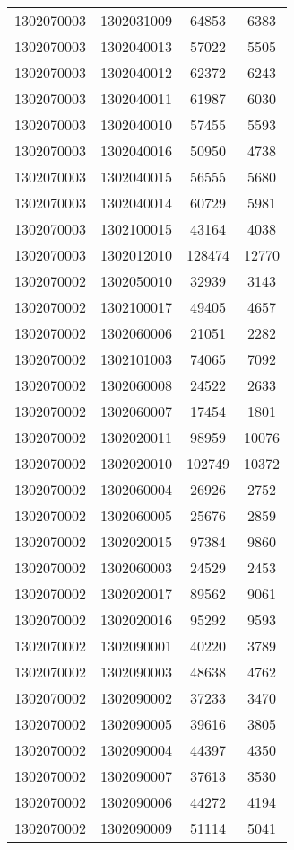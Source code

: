 \begin{longtable}[h]{llcc}
		1302070003 & 1302031009 & 64853 & 6383\\
		1302070003 & 1302040013 & 57022 & 5505\\
		1302070003 & 1302040012 & 62372 & 6243\\
		1302070003 & 1302040011 & 61987 & 6030\\
		1302070003 & 1302040010 & 57455 & 5593\\
		1302070003 & 1302040016 & 50950 & 4738\\
		1302070003 & 1302040015 & 56555 & 5680\\
		1302070003 & 1302040014 & 60729 & 5981\\
		1302070003 & 1302100015 & 43164 & 4038\\
		1302070003 & 1302012010 & 128474 & 12770\\
		1302070002 & 1302050010 & 32939 & 3143\\
		1302070002 & 1302100017 & 49405 & 4657\\
		1302070002 & 1302060006 & 21051 & 2282\\
		1302070002 & 1302101003 & 74065 & 7092\\
		1302070002 & 1302060008 & 24522 & 2633\\
		1302070002 & 1302060007 & 17454 & 1801\\
		1302070002 & 1302020011 & 98959 & 10076\\
		1302070002 & 1302020010 & 102749 & 10372\\
		1302070002 & 1302060004 & 26926 & 2752\\
		1302070002 & 1302060005 & 25676 & 2859\\
		1302070002 & 1302020015 & 97384 & 9860\\
		1302070002 & 1302060003 & 24529 & 2453\\
		1302070002 & 1302020017 & 89562 & 9061\\
		1302070002 & 1302020016 & 95292 & 9593\\
		1302070002 & 1302090001 & 40220 & 3789\\
		1302070002 & 1302090003 & 48638 & 4762\\
		1302070002 & 1302090002 & 37233 & 3470\\
		1302070002 & 1302090005 & 39616 & 3805\\
		1302070002 & 1302090004 & 44397 & 4350\\
		1302070002 & 1302090007 & 37613 & 3530\\
		1302070002 & 1302090006 & 44272 & 4194\\
		1302070002 & 1302090009 & 51114 & 5041\\

\end{longtable}
